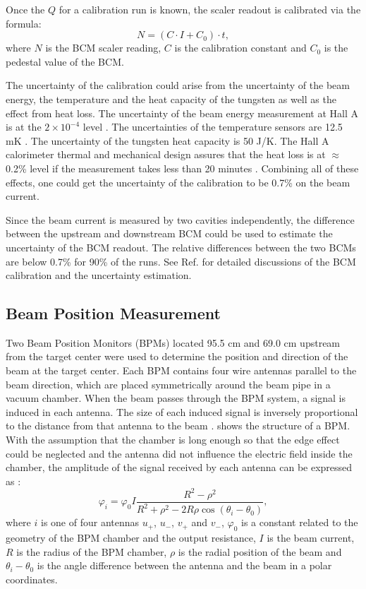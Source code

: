 Once the $Q$ for a calibration run is known, the scaler readout is calibrated via the formula:
\begin{equation} \label{C5S2SS2E2}
N = (C\cdot I+C_0)\cdot t,
\end{equation}
where $N$ is the BCM scaler reading, $C$ is the calibration constant and $C_0$ is the pedestal value of the BCM.

The uncertainty of the calibration could arise from the uncertainty of the beam energy, the temperature and the heat capacity of the tungsten as well as the effect from heat loss. The uncertainty of the beam energy measurement at Hall A is at the $2\times10^{-4}$ level \cite{BEAMENERGY}. The uncertainties of the temperature sensors are 12.5 mK \cite{CALORIMETERLEDEX}. The uncertainty of the tungsten heat capacity is 50 J/K. The Hall A calorimeter thermal and mechanical design assures that the heat loss is at $\approx$0.2\% level if the measurement takes less than 20 minutes \cite{Bevins2005}. Combining all of these effects, one could get the uncertainty of the calibration to be 0.7\% on the beam current.

Since the beam current is measured by two cavities independently, the difference between the upstream and downstream BCM could be used to estimate the uncertainty of the BCM readout. The relative differences between the two BCMs are below 0.7\% for 90\% of the runs. See Ref. \cite{Zhu2015} for detailed discussions of the BCM calibration and the uncertainty estimation.

\subsection{Beam Position Measurement}
\label{C5S2SS3}

Two Beam Position Monitors (BPMs) located 95.5 cm and 69.0 cm upstream from the target center were used to determine the position and direction of the beam at the target center. Each BPM contains four wire antennas parallel to the beam direction, which are placed symmetrically around the beam pipe in a vacuum chamber. When the beam passes through the BPM system, a signal is induced in each antenna. The size of each induced signal is inversely proportional to the distance from that antenna to the beam \cite{Barry1991}.  shows the structure of a BPM. With the assumption that the chamber is long enough so that the edge effect could be neglected and the antenna did not influence the electric field inside the chamber, the amplitude of the signal received by each antenna can be expressed as \cite{Piot2005}:
\begin{equation} \label{C5S2SS3E1}
\varphi_i = \varphi_0 I\frac{R^2-\rho^2}{R^2+\rho^2-2R\rho\cos(\theta_i-\theta_0)},
\end{equation}
where $i$ is one of four antennas $u_+$, $u_-$, $v_+$ and $v_-$, $\varphi_0$ is a constant related to the geometry of the BPM chamber and the output resistance, $I$ is the beam current, $R$ is the radius of the BPM chamber, $\rho$ is the radial position of the beam and $\theta_i-\theta_0$ is the angle difference between the antenna and the beam in a polar coordinates.

